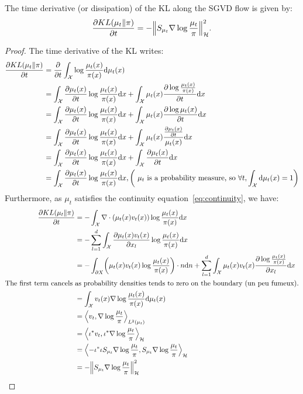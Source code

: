 \documentclass[runningheads,a4paper]{llncs}
\newcommand{\X}{\mathcal{X}}
\newcommand{\Hr}{\mathcal{H}}
\newcommand{\diff}[2]{\frac{\partial #1}{\partial #2}}
\newcommand{\dr}{\mathrm{d}}
\DeclarePairedDelimiter{\norm}{\|}{\|}
\DeclarePairedDelimiter{\pare}{(}{)}
\DeclarePairedDelimiter{\sca}{\langle}{\rangle}
\begin{document}
\begin{proposition}
  The time derivative (or dissipation) of the KL along the SGVD flow is given by:
  $$
  \diff{KL(\mu_t \| \pi)}{t} = -\norm*{S_{\mu_t} \nabla \log \frac{\mu_t}{\pi}}_\Hr^2.
  $$
  \begin{proof}
    The time derivative of the KL writes:
    \begin{align*}
      \diff{KL(\mu_t \| \pi)}{t} &= \diff{ }{t} \int_\X \log \frac{\mu_t(x)}{\pi(x)} \dr \mu_t(x) \\
      &= \int_\X \diff{\mu_t(x)}{t} \log \frac{\mu_t(x)}{\pi(x)} \dr x
        + \int_\X \mu_t(x) \diff{\log \frac{\mu_t(x)}{\pi(x)}}{t} \dr x \\
      &= \int_\X \diff{\mu_t(x)}{t} \log \frac{\mu_t(x)}{\pi(x)} \dr x
        + \int_\X \mu_t(x) \diff{\log \mu_t(x)}{t} \dr x \\
      &= \int_\X \diff{\mu_t(x)}{t} \log \frac{\mu_t(x)}{\pi(x)} \dr x
        + \int_\X \mu_t(x) \frac{\diff{\mu_t(x)}{t}}{\mu_t(x)} \dr x \\
      &= \int_\X \diff{\mu_t(x)}{t} \log \frac{\mu_t(x)}{\pi(x)} \dr x
        + \int_\X \diff{\mu_t(x)}{t} \dr x \\
      &= \int_\X \diff{\mu_t(x)}{t} \log \frac{\mu_t(x)}{\pi(x)} \dr x
     , \pare*{\text{ $\mu_t$ is a probability measure, so } \forall t, \int_\X \dr \mu_t(x) = 1}
    \end{align*}
    Furthermore, as $\mu_t$ satisfies the continuity equation~\eqref{eq:continuity}, we have:
    \begin{align*}
      \diff{KL(\mu_t \| \pi)}{t} &= -\int_\X \nabla \cdot (\mu_t(x) v_t(x)) \log \frac{\mu_t(x)}{\pi(x)} \dr x \\
      &= -\sum_{l=1}^d \int_\X \diff{\mu_t(x) v_t(x)}{x_l} \log \frac{\mu_t(x)}{\pi(x)} \dr x \\
      &= -\int_{\partial X} \pare* {\mu_t(x) v_t(x) \log \frac{\mu_t(x)}{\pi(x)}} \cdot n \dr n
        + \sum_{l=1}^d \int_\X \mu_t(x) v_t(x) \diff{\log \frac{\mu_t(x)}{\pi(x)}}{x_l} \dr x \\
      \text{The first term cancels }& \text{as probability densities tends to zero on the boundary (un peu fumeux).} \\
      &= \int_\X v_t(x) \nabla \log \frac{\mu_t(x)}{\pi(x)} \dr \mu_t(x) \\
      &= \sca*{v_t, \nabla \log \frac{\mu_t}{\pi}}_{L^2(\mu_t)} \\
      &= \sca*{\iota^* v_t, \iota^* \nabla \log \frac{\mu_t}{\pi}}_{\Hr} \\
      &= \sca*{-\iota^* \iota S_{\mu_t} \nabla \log \frac{\mu_t}{\pi}, S_{\mu_t} \nabla \log \frac{\mu_t}{\pi}}_{\Hr} \\
      &= -\norm*{S_{\mu_t} \nabla \log \frac{\mu_t}{\pi}}_\Hr^2
    \end{align*}
  \end{proof}
\end{proposition}
\end{document}
